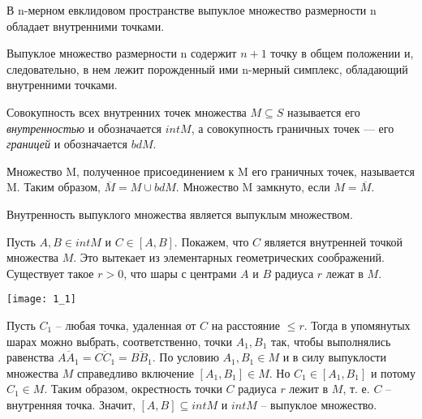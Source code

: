 \begin{theorem}[]\label{cha:1/the:2}
	В n-мерном евклидовом пространстве выпуклое множество размерности n обладает внутренними точками.
\end{theorem}
\begin{Proof}
	Выпуклое множество размерности n содержит $n+1$ точку в общем положении и, следовательно, в нем лежит порожденный ими n-мерный симплекс, обладающий внутренними точками.
\end{Proof}

\begin{definition}\label{cha:1/def:4}
	Совокупность всех внутренних точек множества $M \subseteq S$ называется его \textit{внутренностью} и обозначается $int M$, а совокупность граничных точек — его \textit{границей} и обозначается $bd M$.
\end{definition}

\begin{definition}\label{cha:1/def:5}
	Множество M, полученное присоединением к M его граничных точек, называется  M. Таким образом, $\overline{M} = M \cup bd M$. Множество M замкнуто, если $M = \overline{M}$.
\end{definition}

\begin{propose}[]\label{cha:1/propose:2}
	Внутренность выпуклого множества является выпуклым множеством.
\end{propose}
\begin{Proof}
	Пусть $A, B \in int M$ и $C \in [A, B]$. Покажем, что $C$ является внутренней точкой множества $M$. Это вытекает из элементарных геометрических соображений. Существует такое $r > 0$, что шары с центрами $A$ и $B$ радиуса $r$ лежат в $M$. 

	\begin{center}
		\texttt{[image: 1\_1]}
	\end{center}

	Пусть $C_1$ – любая точка, удаленная от $C$ на расстояние $\le r$. Тогда в упомянутых шарах можно выбрать, соответственно, точки $A_1, B_1$ так, чтобы выполнялись равенства $\overline{AA_1} = \overline{CC_1} = \overline{BB_1}$. По условию $A_1, B_1 \in M$ и в силу выпуклости множества $M$ справедливо включение $[A_1, B_1] \in M$. Но $C_1 \in [A_1, B_1]$ и потому $C_1 \in M$. Таким образом, окрестность точки $C$ радиуса $r$ лежит в $M$, т. е. $C$ – внутренняя точка. Значит, $[A, B] \subseteq int M$ и $int M$ – выпуклое множество.

\end{Proof}

